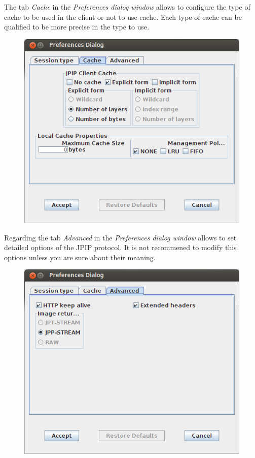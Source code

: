 \documentclass[a4paper,10pt]{article}
\begin{document}
The tab \emph{Cache} in the \emph{Preferences dialog window} allows to configure
the type of cache to be used in the client or not to use cache. Each type of cache
can be qualified to be more precise in the type to use. \\
\begin{figure}[!h]
	\centering
	\includegraphics[scale=0.4]{images/CADIViewer-screenshot-PreferencesDialog_Cache.png} \\
\end{figure}
\vspace*{0.5cm}

Regarding the tab \emph{Advanced} in the \emph{Preferences dialog window} allows to
set detailed options of the JPIP protocol. It is not recommened to modify this options
unless you are sure about their meaning. \\
\begin{figure}[!h]
	\centering
	\includegraphics[scale=0.4]{images/CADIViewer-screenshot-PreferencesDialog_advanced.png} \\
\end{figure}
\vspace*{0.5cm}
\end{document}
